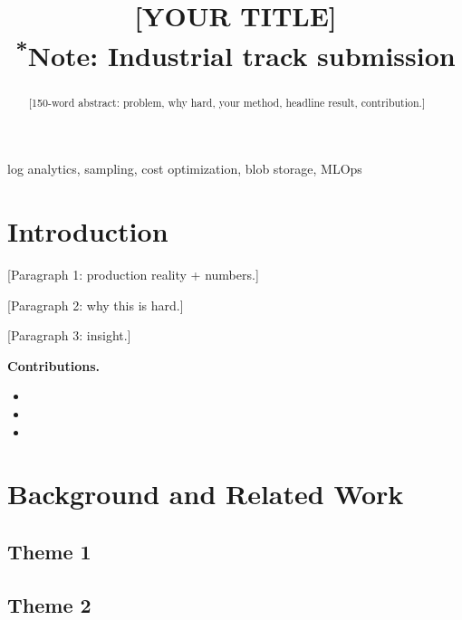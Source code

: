 \documentclass[conference]{IEEEtran}
\begin{document}
\title{[YOUR TITLE]\\
{\footnotesize \textsuperscript{*}Note: Industrial track submission}}

\author{
\and
\IEEEauthorblockN{[Co-Author]}
}

\maketitle

\begin{abstract}
[150-word abstract: problem, why hard, your method, headline result, contribution.]
\end{abstract}

\begin{IEEEkeywords}
log analytics, sampling, cost optimization, blob storage, MLOps
\end{IEEEkeywords}

\section{Introduction}
[Paragraph 1: production reality + numbers.]

[Paragraph 2: why this is hard.]

[Paragraph 3: insight.]

\textbf{Contributions.}
\begin{itemize}
\item [Contribution 1]
\item [Contribution 2]
\item [Contribution 3]
\end{itemize}

\section{Background and Related Work}
\subsection{Theme 1}
\subsection{Theme 2}
\end{document}
